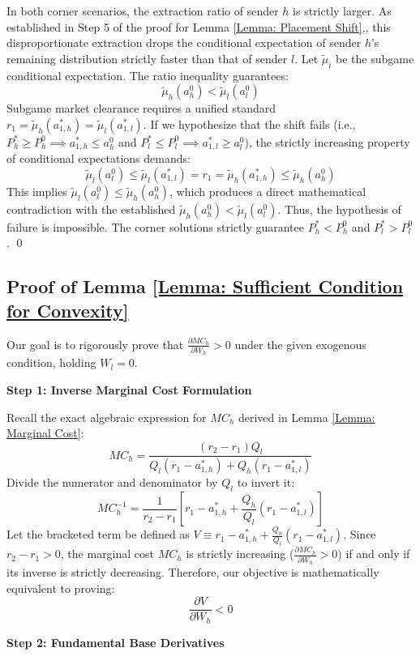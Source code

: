 \documentclass[12pt, a4paper]{article}
\begin{document}
In both corner scenarios, the extraction ratio of sender $h$ is strictly larger. As established in Step 5 of the proof for Lemma \ref{Lemma: Placement Shift},, this disproportionate extraction drops the conditional expectation of sender $h$'s remaining distribution strictly faster than that of sender $l$. Let $\tilde{\mu}_i$ be the subgame conditional expectation. The ratio inequality guarantees:
\[
    \tilde{\mu}_h(a_h^0) < \tilde{\mu}_l(a_l^0)
\]
Subgame market clearance requires a unified standard $r_1 = \tilde{\mu}_h(a_{1,h}^*) = \tilde{\mu}_l(a_{1,l}^*)$. 
If we hypothesize that the shift fails (i.e., $P_h^* \ge P_h^0 \implies a_{1,h}^* \le a_h^0$ and $P_l^* \le P_l^0 \implies a_{1,l}^* \ge a_l^0$), the strictly increasing property of conditional expectations demands:
\[
    \tilde{\mu}_l(a_l^0) \le \tilde{\mu}_l(a_{1,l}^*) = r_1 = \tilde{\mu}_h(a_{1,h}^*) \le \tilde{\mu}_h(a_h^0)
\]
This implies $\tilde{\mu}_l(a_l^0) \le \tilde{\mu}_h(a_h^0)$, which produces a direct mathematical contradiction with the established $\tilde{\mu}_h(a_h^0) < \tilde{\mu}_l(a_l^0)$. 
Thus, the hypothesis of failure is impossible. The corner solutions strictly guarantee $P_h^* < P_h^0$ and $P_l^* > P_l^0$.
\qed

\subsection*{Proof of Lemma \ref{Lemma: Sufficient Condition for Convexity}}

Our goal is to rigorously prove that $\frac{\partial MC_h}{\partial W_h} > 0$ under the given exogenous condition, holding $W_l = 0$.

\textbf{Step 1: Inverse Marginal Cost Formulation}

Recall the exact algebraic expression for $MC_h$ derived in Lemma \ref{Lemma: Marginal Cost}:
\[
    MC_h = \frac{(r_2 - r_1) Q_l}{Q_l(r_1 - a_{1,h}^*) + Q_h(r_1 - a_{1,l}^*)}
\]
Divide the numerator and denominator by $Q_l$ to invert it:
\[
    MC_h^{-1} = \frac{1}{r_2 - r_1} \left[ r_1 - a_{1,h}^* + \frac{Q_h}{Q_l}(r_1 - a_{1,l}^*) \right]
\]
Let the bracketed term be defined as $V \equiv r_1 - a_{1,h}^* + \frac{Q_h}{Q_l}(r_1 - a_{1,l}^*)$. 
Since $r_2 - r_1 > 0$, the marginal cost $MC_h$ is strictly increasing ($\frac{\partial MC_h}{\partial W_h} > 0$) if and only if its inverse is strictly decreasing. Therefore, our objective is mathematically equivalent to proving:
\[
    \frac{\partial V}{\partial W_h} < 0
\]

\textbf{Step 2: Fundamental Base Derivatives}
\end{document}
